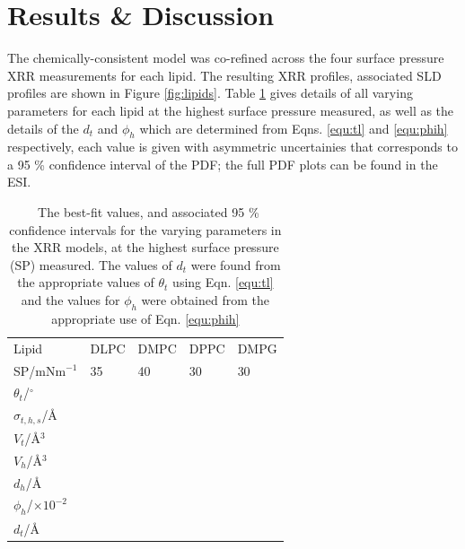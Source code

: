 \documentclass[twoside,twocolumn,9pt]{article}
\begin{document}
\section{Results \& Discussion}
The chemically-consistent model was co-refined across the four surface pressure XRR measurements for each lipid. The resulting XRR profiles, associated SLD profiles are shown in Figure \ref{fig:lipids}. Table \ref{tab:liptab} gives details of all varying parameters for each lipid at the highest surface pressure measured, as well as the details of the $d_t$ and $\phi_h$ which are determined from Eqns. \ref{equ:tl} and \ref{equ:phih} respectively, each value is given with asymmetric uncertainies that corresponds to a 95 \% confidence interval of the PDF; the full PDF plots can be found in the ESI.
%
\begin{table}
	\small
	\caption{\ The best-fit values, and associated 95 \% confidence intervals for the varying parameters in the XRR models, at the highest surface pressure (SP) measured. The values of $d_t$ were found from the appropriate values of $\theta_t$ using Eqn. \ref{equ:tl} and the values for $\phi_h$ were obtained from the appropriate use of Eqn. \ref{equ:phih}}
	\label{tab:liptab}
	\begin{tabular*}{0.48\textwidth}{@{\extracolsep{\fill}}lllll}
		\hline
		Lipid & DLPC & DMPC & DPPC & DMPG \\
    SP/mNm$^{-1}$ & 35 & 40 & 30 & 30 \\
		\hline
		$\theta_t$/$^\circ$ &  &  &  &  \\
		$\sigma_{t,h,s}$/\AA &  &  &  &  \\
    \hline
    $V_t$/\AA$^3$ &  &  &  &  \\
		$V_h$/\AA$^3$ &  &  &  &  \\
		$d_h$/\AA &  &  &  &  \\
    \hline
    $\phi_h$/$\times10^{-2}$ &  &  &  &  \\
		$d_t$/\AA &  &  &  &  \\
		\hline
	\end{tabular*}
\end{table}
%
\end{document}
